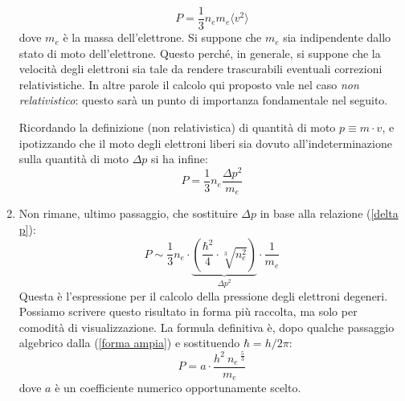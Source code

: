 \begin{enumerate}
\begin{equation}
P=\frac{1}{3} n_{e} m_{e} \langle v^{2} \rangle
\end{equation}
dove $m_{e}$ è la massa dell'elettrone. Si suppone che $m_{e}$ sia indipendente dallo stato di moto dell'elettrone. Questo perch\'{e}, in generale, si suppone che la velocit\`{a} degli elettroni sia tale da rendere trascurabili eventuali correzioni relativistiche. In altre parole il calcolo qui proposto vale nel caso \emph{non relativistico}: questo sar\`{a} un punto di importanza fondamentale nel seguito.
\par
Ricordando la definizione (non relativistica) di quantit\`{a} di moto $p \equiv m \cdot v$, e ipotizzando che il moto degli elettroni liberi sia dovuto all'indeterminazione sulla quantit\`{a} di moto $\Delta p$ si ha infine:
\begin{equation}\label{finalmente}
P=\frac{1}{3}n_{e}\frac{\Delta p^{2}}{m_{e}}
\end{equation}
\item
Non rimane, ultimo passaggio, che sostituire $\Delta p$ in base alla relazione (\ref{delta p}):
\begin{equation}\label{forma ampia}
P \sim \frac{1}{3} n_{e} \cdot \underbrace{\left( \frac{\hbar^{2}}{4} \cdot \sqrt[3]{n_{e}^{2}} \right)}_{\Delta p^{2}} \cdot \frac{1}{m_{e}}
\end{equation}
Questa è l'espressione per il calcolo della pressione degli elettroni degeneri. Possiamo scrivere questo risultato in forma più raccolta, ma solo per comodit\`{a} di visualizzazione.
La formula definitiva è, dopo qualche passaggio algebrico dalla (\ref{forma ampia}) e sostituendo $\hbar=h/2\pi$:
\begin{equation}\label{stato degenere}
P=a \cdot \frac{h^{2} \ n_{e}\,^{\frac{5}{3}}}{m_{e}}
\end{equation}
dove $a$ è un coefficiente numerico opportunamente scelto.
\end{enumerate}
